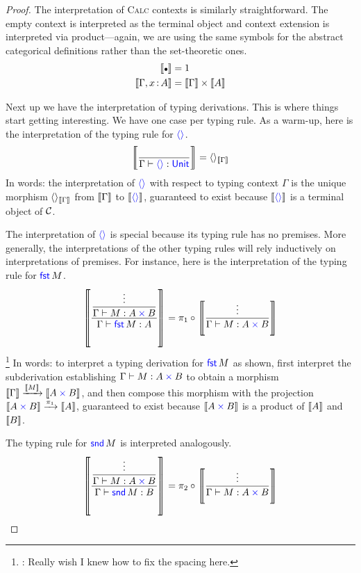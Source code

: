 \begin{proof}
  The interpretation of \textsc{Calc} contexts is similarly straightforward.
  The empty context is interpreted as the terminal object
  and context extension is interpreted via product---again, we are using the same symbols for the abstract categorical definitions
  rather than the set-theoretic ones.
  \begin{align}
    \llbr{\ctxemp} &= 1 \\
    \llbr{\Gamma, x\ofty A} &= \llbr{\Gamma} \times \llbr{A}
  \end{align}

  Next up we have the interpretation of typing derivations.
  This is where things start getting interesting.
  We have one case per typing rule. As a warm-up,
  here is the interpretation of the typing rule for \({{\color{blue}\langle \rangle}}\).
  \begin{align}
    \left\llbracket 
      \frac
        {~}
        {\Gamma \vdash {{\color{blue}\langle \rangle}} : \mathsf{{\color{blue}Unit}}}
    \right\rrbracket
    = \langle \rangle_{\left\llbracket \Gamma\right\rrbracket}
  \end{align}
  In words: the interpretation of \({{\color{blue}\langle \rangle}}\)
  with respect to typing context \(\Gamma\)
  is the unique morphism \(\langle \rangle_{\left\llbracket \Gamma\right\rrbracket}\)
  from \(\left\llbracket \Gamma\right\rrbracket\) to \(\left\llbracket {{\color{blue}\langle \rangle}}\right\rrbracket\),
  guaranteed to exist because \(\left\llbracket {{\color{blue}\langle \rangle}}\right\rrbracket\)
  is a terminal object of \(\mathcal C\).

  The interpretation of \({{\color{blue}\langle \rangle}}\) is special because its typing rule has no premises.
  More generally, the interpretations of the other typing rules
  will rely inductively on interpretations of premises.
  For instance, here is the interpretation of the typing rule for \(\mathsf{{\color{blue}fst}}\,M\).
  \begin{align}
    \left\llbracket 
      \dfrac
        {\displaystyle\frac{\vdots}{{{{\Gamma \vdash M : A \mathbin{{\color{blue}\times}} B}}}}}
        {\Gamma \vdash \mathsf{{\color{blue}fst}}\,M : A}
    \right\rrbracket
    = \pi_1 \circ \left\llbracket \frac{\vdots}{\Gamma \vdash M : A \mathbin{{\color{blue}\times}} B}\right\rrbracket
  \end{align}
  \footnote{\todo: Really wish I knew how to fix the spacing here.}
  In words: to interpret a typing derivation for \(\mathsf{{\color{blue}fst}}\,M\)
  as shown, first interpret the subderivation
  establishing \(\Gamma \vdash M : A \mathbin{{\color{blue}\times}} B\)
  to obtain a morphism \(\left\llbracket \Gamma\right\rrbracket \xrightarrow{\left\llbracket M\right\rrbracket} \left\llbracket A\mathbin{{\color{blue}\times}} B\right\rrbracket\),
  and then compose this morphism with the projection
  \(\left\llbracket A\mathbin{{\color{blue}\times}} B\right\rrbracket \xrightarrow{\pi_1} \left\llbracket A\right\rrbracket\),
  guaranteed to exist because \(\left\llbracket A \mathbin{{\color{blue}\times}} B\right\rrbracket\)
  is a product of \(\left\llbracket A\right\rrbracket\) and \(\left\llbracket B\right\rrbracket\).

  The typing rule for \(\mathsf{{\color{blue}snd}}\,M\) is interpreted analogously.
  \begin{align}
    \left\llbracket 
      \displaystyle\frac
        {\displaystyle\frac{\vdots}{{{{\Gamma \vdash M : A \mathbin{{\color{blue}\times}} B}}}}}
        {\Gamma \vdash \mathsf{{\color{blue}snd}}\,M : B}
    \right\rrbracket
    = \pi_2 \circ \left\llbracket \frac{\vdots}{\Gamma \vdash M : A \mathbin{{\color{blue}\times}} B}\right\rrbracket
  \end{align}


\end{proof}
